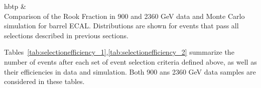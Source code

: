 \begin{2figures}{hbtp}
 &
  \\
  \caption{Comparison of the Rook Fraction in 900 and 2360 GeV data and Monte Carlo
  simulation for barrel ECAL. Distributions are shown for events that pass all
  selections described in previous sections.}
\label{fig:ecal_noise_3}
\end{2figures}

Tables~\ref{tab:selectionefficiency_1},\ref{tab:selectionefficiency_2}
summarize the number of events after each set of event selection
criteria defined above, as well as their efficiencies in data and
simulation. Both 900 ans 2360 GeV data samples are considered in these tables.

